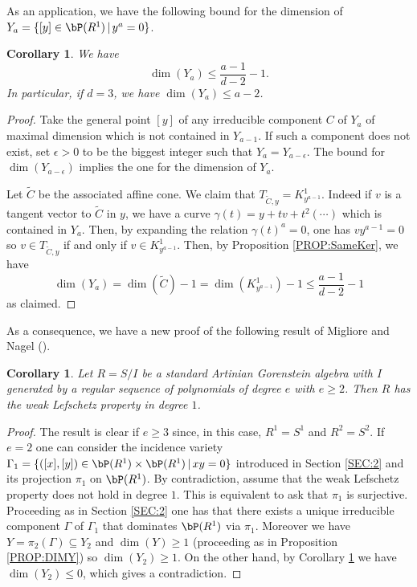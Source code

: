\documentclass[a4paper,11pt]{amsart}
\newtheorem{corollary}[theorem]{Corollary}
\begin{document}
As an application, we have the following bound for the dimension of $Y_a=\{[y]\in \bP(R^1)\,|\, y^a=0\}$.

\begin{corollary} 
\label{COR:DimYa}
We have $$\dim (Y_a) \leq \frac {a-1}{d-2}-1.$$
In particular, if $d=3$, we have
$\dim (Y_{a})\leq a-2$.
 
\end{corollary}
\begin{proof}
Take the general point
$[y]$ of any irreducible component $C$ of $Y_a$ of maximal dimension which is not contained in $Y_{a-1}$. If such a component does not exist, set $\epsilon>0$ to be the biggest integer such that $Y_a=Y_{a-\epsilon}$. The bound for $\dim(Y_{a-\epsilon})$ implies the one for the dimension of $Y_a$.

Let $\tilde{C}$ be the associated affine cone. We claim that $T_{\tilde{C},y}=K^1_{y^{a-1}}$. Indeed if $v$ is a tangent vector to $\tilde{C}$ in $y$, we have a curve $\gamma(t)=y+tv+t^2(\cdots)$ which is contained in $Y_a$. Then, by expanding the relation $\gamma(t)^a=0$, one has $vy^{a-1}=0$ so $v\in T_{\tilde{C},y}$ if and only if $v\in K^1_{y^{a-1}}$. Then, by Proposition \ref{PROP:SameKer}, we have
$$\dim(Y_a)=\dim(\tilde{C})-1=\dim(K^{1}_{y^{a-1}})-1\leq\frac{a-1}{d-2}-1$$
as claimed.
\end{proof}

As a consequence, we have a new proof of the following result of Migliore and Nagel (\cite[Proposition 4.3]{MN13}).

\begin{corollary}
\label{COR:WLP1}
Let $R=S/I$ be a standard Artinian Gorenstein algebra with $I$ generated by a regular sequence of polynomials of degree $e$ with $e\geq 2$. Then $R$ has the weak Lefschetz property in degree $1$.
\end{corollary}

\begin{proof}
The result is clear if $e\geq 3$ since, in this case, $R^1=S^1$ and $R^2=S^2$. If $e=2$ one can consider the incidence variety $\Gamma_{1}=\{([x],[y])\in \bP(R^1)\times \bP(R^1)\,|\, xy=0\}$ introduced in Section \ref{SEC:2} and its projection $\pi_1$ on $\bP(R^1)$. By contradiction, assume that the weak Lefschetz property does not hold in degree $1$. This is equivalent to ask that $\pi_1$ is surjective. Proceeding as in Section \ref{SEC:2} one has that there exists a unique irreducible component $\Gamma$ of $\Gamma_1$ that dominates $\bP(R^1)$ via $\pi_1$. Moreover we have $Y=\pi_2(\Gamma)\subseteq Y_2$ and $\dim(Y)\geq 1$ (proceeding as in Proposition \ref{PROP:DIMY}) so $\dim(Y_2)\geq 1$. On the other hand, by Corollary \ref{COR:DimYa} we have $\dim(Y_2)\leq 0$, which gives a contradiction.
\end{proof}
\end{document}
